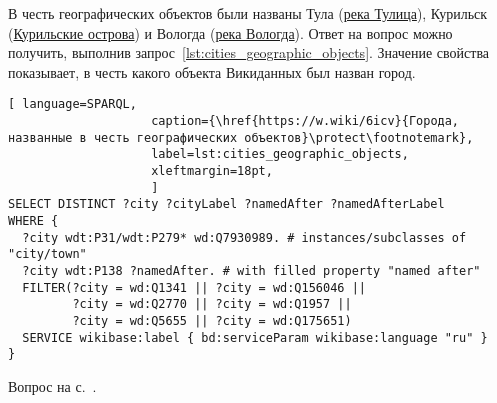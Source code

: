 \begin{task}
    \label{answer:cities_geographic_objects}
    В честь географических объектов были названы 
    Тула (\href{https://w.wiki/oLJ}{река Тулица}), 
    Курильск (\href{https://w.wiki/oLH}{Курильские острова}) 
    и Вологда (\href{https://w.wiki/oLG}{река Вологда}). 
    Ответ на вопрос можно получить, выполнив запрос~\ref{lst:cities_geographic_objects}. 
    Значение свойства  
    показывает, в честь какого объекта Викиданных был назван город.
   
\begin{lstlisting}[ language=SPARQL, 
                    caption={\href{https://w.wiki/6icv}{Города, названные в честь географических объектов}\protect\footnotemark},
                    label=lst:cities_geographic_objects,
                    xleftmargin=18pt, 
                    ]
SELECT DISTINCT ?city ?cityLabel ?namedAfter ?namedAfterLabel 
WHERE {
  ?city wdt:P31/wdt:P279* wd:Q7930989. # instances/subclasses of "city/town" 
  ?city wdt:P138 ?namedAfter. # with filled property "named after"
  FILTER(?city = wd:Q1341 || ?city = wd:Q156046 ||
         ?city = wd:Q2770 || ?city = wd:Q1957 ||
         ?city = wd:Q5655 || ?city = wd:Q175651)
  SERVICE wikibase:label { bd:serviceParam wikibase:language "ru" }
}
\end{lstlisting}%

    \small{\AnswerBackref Вопрос на с.~\pageref{lst:population_town}.}
\end{task}




